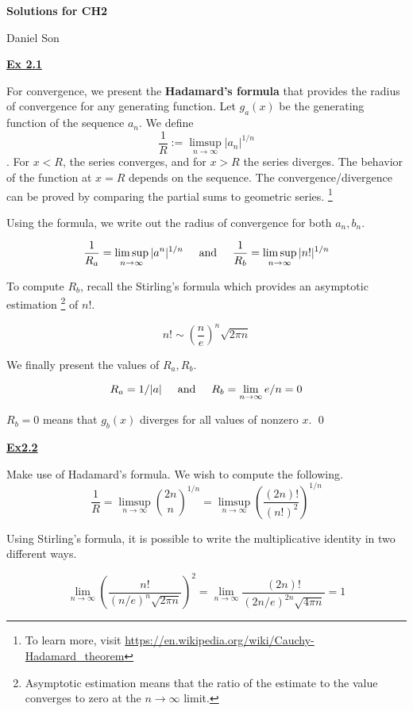 \documentclass{article}
\newcommand{\new}[1]{
    \vspace{2mm}
    \noindent
    \textbf{
    \underline{#1}}
}
\newcommand{\textAnd}{
    {
        \hspace{5mm}
        \textrm{and}
        \hspace{5mm}
    }
}
\begin{document}
\begin{center}
    \LARGE
    \textbf{Solutions for CH2}

    \large
    Daniel Son
\end{center}

\new{Ex 2.1}

For convergence, we present the \textbf{Hadamard's formula} 
that provides the radius of convergence for any 
generating function. Let $g_a(x)$ be the generating 
function of the sequence $a_n$. We define 
\[
\frac 1 R := \limsup_{n \rightarrow \infty} |a_n|^{1/n}
\]
. For $x < R$, the series converges, and for $x>R$ the 
series diverges. The behavior of the function at $x=R$ 
depends on the sequence. The convergence/divergence 
can be proved by comparing the partial sums to geometric 
series.
\footnote{To learn more, visit 
\url{https://en.wikipedia.org/wiki/Cauchy-Hadamard_theorem}}

Using the formula, we write out the radius of convergence 
for both $a_n, b_n$. 

\[
\frac 1 {R_a} = \limsup_{n \rightarrow \infty} |a^n|^{1/n} 
\textAnd 
\frac 1 {R_b} = \limsup_{n \rightarrow \infty} |n!|^{1/n} 
\]

To compute $R_b$, recall the Stirling's formula which 
provides an asymptotic estimation
\footnote{Asymptotic estimation means that the ratio 
of the estimate to the value converges to zero at the $n \rightarrow 
\infty$ limit. }
of $n!$. 

\[
    n! \sim \left(
        \frac n e
    \right)^n \sqrt{2\pi n}
\]

We finally present the values of $R_a, R_b$. 

\[
    R_a = 1/|a| \textAnd R_b = \lim_{n \rightarrow \infty}e/n = 0
\]

$R_b = 0$ means that $g_b(x)$ diverges for all values of nonzero $x$. 
\hfill \qed

\new{Ex2.2} 

Make use of Hadamard's formula. We wish to compute the following. 
\begin{equation} \label{22r}
\frac 1 R = \limsup_{n\rightarrow \infty} \binom{2n}{n} ^{1/n}
= 
\limsup_{n\rightarrow \infty}
\left(
    \frac {(2n)!}{(n!)^2}
\right)^{1/n}
\end{equation}

Using Stirling's formula, it is possible to write the multiplicative 
identity in two different ways. 


\[
    \lim_{n \rightarrow \infty} 
    \left(\frac {n!}{(n/e)^n \sqrt{2\pi n}}
    \right)^2
    = 
    \lim_{n \rightarrow \infty} \frac {(2n)!}{(2n/e)^{2n} \sqrt{4\pi n}}
    = 1
\]
\pagebreak
\end{document}
